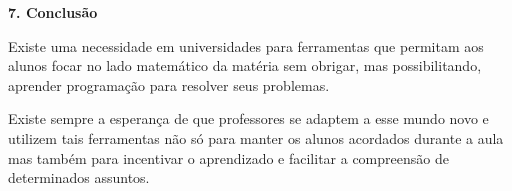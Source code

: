 \usepackage[ascii]{inputenc}
\usepackage[T1]{fontenc}
\usepackage{amsmath,amssymb,amsfonts,textcomp}
\usepackage{color}
\usepackage{calc}
\usepackage{hyperref}
\hypersetup{colorlinks=true, linkcolor=blue, filecolor=blue, pagecolor=blue, urlcolor=blue}
\usepackage{graphicx}
\newcommand\textsubscript[1]{\ensuremath{{}_{\text{#1}}}}
\makeatletter
\newcommand\ps@Standard{%
\renewcommand\@oddhead{}%
\renewcommand\@evenhead{}%
\renewcommand\@oddfoot{}%
\renewcommand\@evenfoot{}%
\setlength\paperwidth{21.001cm}\setlength\paperheight{29.7cm}\setlength\voffset{-1in}\setlength\hoffset{-1in}\setlength\topmargin{3cm}\setlength\headheight{12pt}\setlength\headsep{0cm}\setlength\footskip{12pt+0cm}\setlength\textheight{29.7cm-3cm-2.499cm-0cm-12pt-0cm-12pt}\setlength\oddsidemargin{2.499cm}\setlength\evensidemargin{2.499cm}\setlength\textwidth{21.001cm-2.499cm-2.499cm}
\renewcommand\thepage{\arabic{page}}
\setlength{\skip\footins}{0.101cm}\renewcommand\footnoterule{\vspace*{-0.018cm}\noindent\textcolor{black}{\rule{0.25\columnwidth}{0.018cm}}\vspace*{0.101cm}}
}
\makeatother
\pagestyle{Standard}
\everymath{\displaystyle}





{\bfseries
7. Conclus\~ao}

{
Existe uma necessidade em universidades para ferramentas que permitam
aos alunos focar no lado matem\'atico da mat\'eria sem obrigar, mas
possibilitando, aprender programa\c{c}\~ao para resolver seus
problemas. }

{
 Existe sempre a esperan\c{c}a de que professores se adaptem a esse
mundo novo e utilizem tais ferramentas n\~ao s\'o para manter os alunos
acordados durante a aula mas tamb\'em para incentivar o aprendizado e
facilitar a compreens\~ao de determinados assuntos.}
